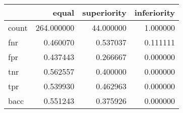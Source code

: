 \begin{tabular}{lrrr}
\toprule
{} &       equal &  superiority &  inferiority \\
\midrule
count &  264.000000 &    44.000000 &     1.000000 \\
fnr   &    0.460070 &     0.537037 &     0.111111 \\
fpr   &    0.437443 &     0.266667 &     0.000000 \\
tnr   &    0.562557 &     0.400000 &     0.000000 \\
tpr   &    0.539930 &     0.462963 &     0.000000 \\
bacc  &    0.551243 &     0.375926 &     0.000000 \\
\bottomrule
\end{tabular}
